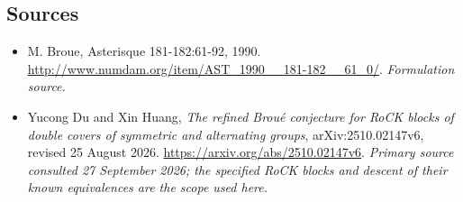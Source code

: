 \documentclass[11pt]{article}
\begin{document}
\subsection{Sources}
\begin{itemize}
\item[S1]M. Broue, Asterisque 181-182:61-92, 1990.
\url{http://www.numdam.org/item/AST_1990__181-182__61_0/}.
\textit{Formulation source.}
\item[E1]Yucong Du and Xin Huang, \emph{The refined Brou\'e conjecture for RoCK blocks of double covers of symmetric and alternating groups}, arXiv:2510.02147v6, revised 25 August 2026.
\url{https://arxiv.org/abs/2510.02147v6}.
\textit{Primary source consulted 27 September 2026; the specified RoCK blocks and descent of their known equivalences are the scope used here.}
\end{itemize}
\end{document}

